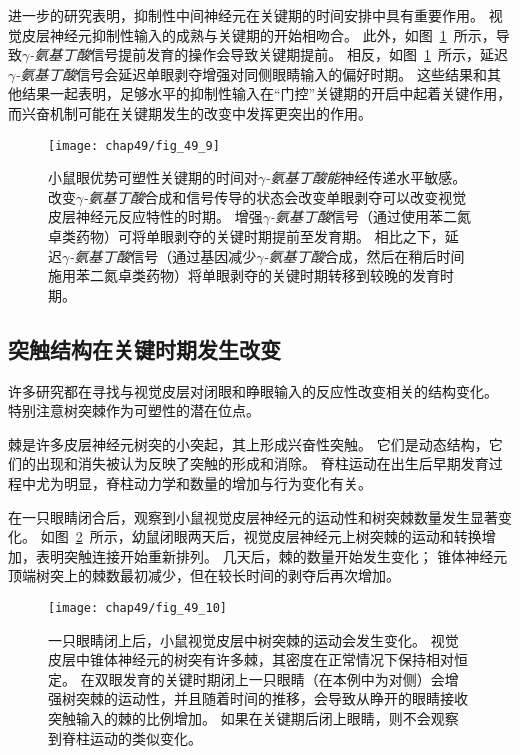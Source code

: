 进一步的研究表明，抑制性中间神经元在关键期的时间安排中具有重要作用。
视觉皮层神经元抑制性输入的成熟与关键期的开始相吻合。
此外，如图~\ref{fig:49_9}~所示，导致\textit{$\gamma$-氨基丁酸}信号提前发育的操作会导致关键期提前。
相反，如图~\ref{fig:49_9}~所示，延迟\textit{$\gamma$-氨基丁酸}信号会延迟单眼剥夺增强对同侧眼睛输入的偏好时期。
这些结果和其他结果一起表明，足够水平的抑制性输入在“门控”关键期的开启中起着关键作用，而兴奋机制可能在关键期发生的改变中发挥更突出的作用。


\begin{figure}[htbp]
	\centering
	\texttt{[image: chap49/fig\_49\_9]}
	\caption{小鼠眼优势可塑性关键期的时间对\textit{$\gamma$-氨基丁酸能}神经传递水平敏感。
		改变\textit{$\gamma$-氨基丁酸}合成和信号传导的状态会改变单眼剥夺可以改变视觉皮层神经元反应特性的时期。
		增强\textit{$\gamma$-氨基丁酸}信号（通过使用苯二氮卓类药物）可将单眼剥夺的关键时期提前至发育期。
		相比之下，延迟\textit{$\gamma$-氨基丁酸}信号（通过基因减少\textit{$\gamma$-氨基丁酸}合成，然后在稍后时间施用苯二氮卓类药物）将单眼剥夺的关键时期转移到较晚的发育时期\cite{daw1998critical}。}
	\label{fig:49_9}
\end{figure}



\subsection{突触结构在关键时期发生改变}

许多研究都在寻找与视觉皮层对闭眼和睁眼输入的反应性改变相关的结构变化。
特别注意树突棘作为可塑性的潜在位点。


棘是许多皮层神经元树突的小突起，其上形成兴奋性突触。
它们是动态结构，它们的出现和消失被认为反映了突触的形成和消除。
脊柱运动在出生后早期发育过程中尤为明显，脊柱动力学和数量的增加与行为变化有关。


在一只眼睛闭合后，观察到小鼠视觉皮层神经元的运动性和树突棘数量发生显著变化。
如图~\ref{fig:49_10}~所示，幼鼠闭眼两天后，视觉皮层神经元上树突棘的运动和转换增加，表明突触连接开始重新排列。
几天后，棘的数量开始发生变化；
锥体神经元顶端树突上的棘数最初减少，但在较长时间的剥夺后再次增加。


\begin{figure}[htbp]
	\centering
	\texttt{[image: chap49/fig\_49\_10]}
	\caption{一只眼睛闭上后，小鼠视觉皮层中树突棘的运动会发生变化。
		视觉皮层中锥体神经元的树突有许多棘，其密度在正常情况下保持相对恒定。
		在双眼发育的关键时期闭上一只眼睛（在本例中为对侧）会增强树突棘的运动性，并且随着时间的推移，会导致从睁开的眼睛接收突触输入的棘的比例增加。
		如果在关键期后闭上眼睛，则不会观察到脊柱运动的类似变化\cite{oray2004dendritic}。}
	\label{fig:49_10}
\end{figure}


